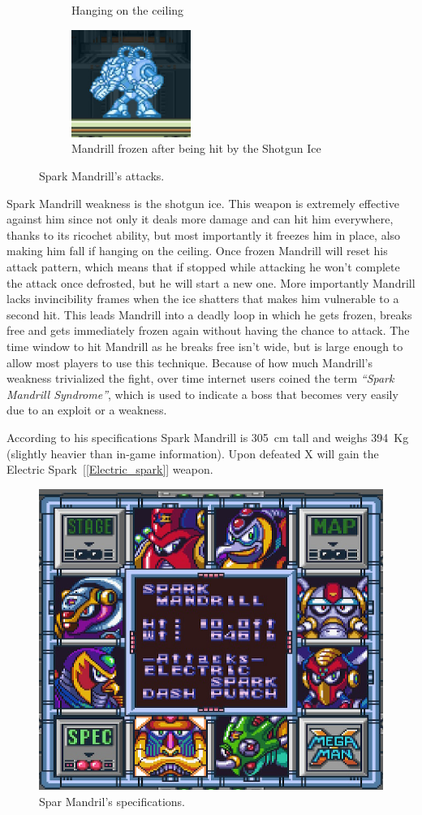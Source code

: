 \begin{figure}[htp]
\begin{subfigure}[t]{0.45\linewidth}
		\caption{Hanging on the ceiling}
	\end{subfigure}
	\begin{subfigure}[t]{0.45\linewidth}
		\centering
		\includegraphics[height=3.5cm]{figures/X1/Spark_mandrill/Mandrill_frozen.jpg}
		\caption{Mandrill frozen after being hit by the Shotgun Ice}
	\end{subfigure}
	\caption{Spark Mandrill's attacks.}
\end{figure}
Spark Mandrill weakness is the shotgun ice. This weapon is extremely effective against him since not only it deals more damage and can hit him everywhere, thanks to its ricochet ability, but most importantly it freezes him in place, also making him fall if hanging on the ceiling. Once frozen Mandrill will reset his attack pattern, which means that if stopped while attacking he won't complete the attack once defrosted, but he will start a new one. More importantly Mandrill lacks invincibility frames when the ice shatters that makes him vulnerable to a second hit. This leads Mandrill into a deadly loop in which he gets frozen, breaks free and gets immediately frozen again without having the chance to attack. The time window to hit Mandrill as he breaks free isn't wide, but is large enough to allow most players to use this technique. Because of how much Mandrill's weakness trivialized the fight, over time internet users coined the term \textit{``Spark Mandrill Syndrome''}, which is used to indicate a boss that becomes very easily due to an exploit or a weakness.

According to his specifications Spark Mandrill is 305~cm tall and weighs 394~Kg (slightly heavier than in-game information). Upon defeated X will gain the Electric Spark~[\ref{Electric_spark}] weapon.


\begin{figure}[htp]
	\centering
	\includegraphics[width=0.4\linewidth]{figures/X1/Spark_mandrill/Spark_mandril_specs.png}
	\caption{Spar Mandril's specifications.}
\end{figure}

